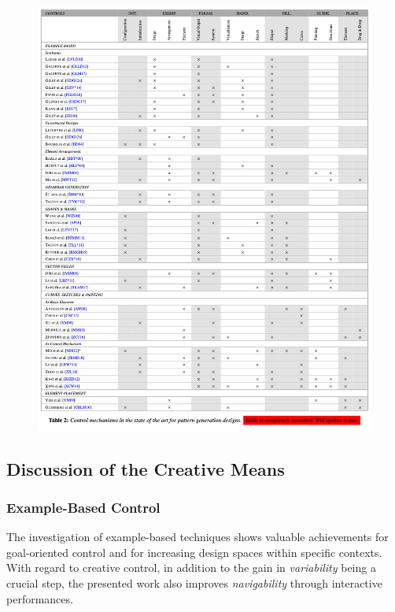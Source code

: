 \begin{figure}
    \centering
    \includegraphics[width=\textwidth]{tables/table_all.png}
\end{figure}




\subsection{Discussion of the Creative Means}
\label{subsec:analysis_creative_means}


\subsubsection{Example-Based Control}
\label{subsubsec:analysis_creative_means_example}

The investigation of example-based techniques shows valuable achievements for goal-oriented control and for increasing design spaces within specific contexts. With regard to creative control, in addition to the gain in \textit{variability} being a crucial step, the presented work also improves \textit{navigability} through interactive performances.


